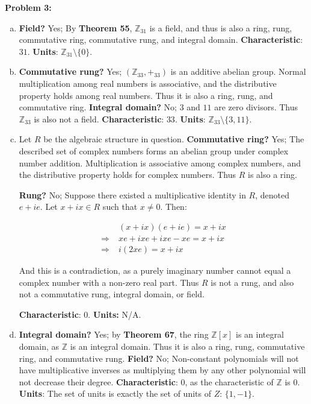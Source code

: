 \documentclass[12pt, letterpaper]{article}
\newenvironment{problem}
    [1]
    {\noindent \textbf{Problem #1:}}
    {\vspace{3mm}}
\begin{document}
\begin{problem}{3}
    \begin{enumerate}[(a)]
        \item \textbf{Field?} Yes; By \textbf{Theorem 55}, $\mathbb{Z}_{31}$ is a field, and thus is 
        also a ring, rung, commutative ring, commutative rung, and integral domain. \textbf{Characteristic}: 
        $31$. \textbf{Units}: $\mathbb{Z}_{31} \setminus \{0\}$.

        \item \textbf{Commutative rung?} Yes; $(\mathbb{Z}_{33}, +_{33})$ is an additive abelian group.
        Normal multiplication among real numbers is associative, and the distributive property holds 
        among real numbers. Thus it is also a ring, rung, and commutative ring. \textbf{Integral domain?}
        No; $3$ and $11$ are zero divisors. Thus $\mathbb{Z}_{33}$ is also not a field. 
        \textbf{Characteristic}: $33$. \textbf{Units}: $\mathbb{Z}_{33} \setminus \{3, 11\}$.

        \item Let $R$ be the algebraic structure in question. \textbf{Commutative ring?} Yes;
        The described set of complex numbers forms an abelian group under complex number addition.
        Multiplication is associative among complex numbers, and the distributive property holds for
        complex numbers. Thus $R$ is also a ring. 
        
        \bigskip\noindent
        \textbf{Rung?} No; Suppose there existed a multiplicative identity in $R$, denoted $e + ie$. 
        Let $x + ix \in R$ such that $x \neq 0$. Then:

        \begin{align*}
            &(x + ix)(e + ie) = x + ix\\
            \Rightarrow \; &xe + ixe + ixe -xe = x + ix\\
            \Rightarrow \; &i(2xe) = x + ix
        \end{align*}

        And this is a contradiction, as a purely imaginary number cannot equal a complex number
        with a non-zero real part. Thus $R$ is not a rung, and also not a commutative rung, integral
        domain, or field.

        \bigskip\noindent
        \textbf{Characteristic}: $0$. \textbf{Units:} N/A.

        \item \textbf{Integral domain?} Yes; by \textbf{Theorem 67}, the ring $\mathbb{Z}[x]$ is an integral 
        domain, as $\mathbb{Z}$ is an integral domain. Thus it is also a ring, rung, commutative ring, and 
        commutative rung. \textbf{Field?} No; Non-constant polynomials will not have multiplicative inverses
        as multiplying them by any other polynomial will not decrease their degree. \textbf{Characteristic}:
        $0$, as the characteristic of $\mathbb{Z}$ is $0$. \textbf{Units}: The set of units is exactly the set 
        of units of $Z$: $\{1, -1\}$.


\end{enumerate}
\end{problem}
\end{document}
